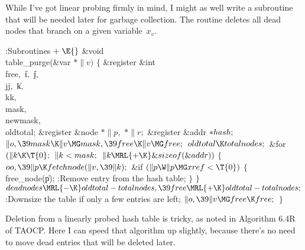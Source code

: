 While I've got linear probing firmly in mind, I might as well
write a subroutine that will be needed later for garbage collection.
The  routine deletes all dead nodes that branch
on a given variable~$x_v$.

\Y\B\4:Subroutines\X${}\mathrel+\E{}$\6
\&{void} \\{table\_purge}(\&{var} ${}{*}\|v){}$\1\1\2\2\6
${}\{{}$\1\6
\&{register} \&{int} \\{free}${},{}$ \|i${},{}$ \|j${},{}$ \\{jj}${},{}$ %
\|k${},{}$ \\{kk}${},{}$ \\{mask}${},{}$ \\{newmask}${},{}$ \\{oldtotal};\6
\&{register} \&{node} ${}{*}\|p,{}$ ${}{*}\|r;{}$\6
\&{register} \&{addr} ${}{*}\\{hash};{}$\7
${}\|o,\39\\{mask}\K\|v\MG\\{mask},\39\\{free}\K\|v\MG\\{free};{}$\6
${}\\{oldtotal}\K\\{totalnodes};{}$\6
\&{for} ${}(\|k\K\T{0};{}$ ${}\|k<\\{mask};{}$ ${}\|k\MRL{+{\K}}\&{sizeof}(%
\&{addr})){}$\5
${}\{{}$\1\6
${}\\{oo},\39\|p\K\\{fetchnode}(\|v,\39\|k);{}$\6
\&{if} ${}(\|p\W\|p\MG\\{xref}<\T{0}){}$\5
${}\{{}$\1\6
\\{free\_node}(\|p);\6
:Remove entry  from the hash table\X;\6
\4${}\}{}$\2\6
\4${}\}{}$\2\6
${}\\{deadnodes}\MRL{-{\K}}\\{oldtotal}-\\{totalnodes},\39\\{free}\MRL{+{\K}}%
\\{oldtotal}-\\{totalnodes};{}$\6
:Downsize the table if only a few entries are left\X;\6
${}\|o,\39\|v\MG\\{free}\K\\{free};{}$\6
\4${}\}{}$\2\par
\fi

Deletion from a linearly probed hash table is tricky, as noted in
Algorithm 6.4R of TAOCP. Here I can speed that algorithm up slightly,
because there's no need to move dead entries that will be deleted later.

